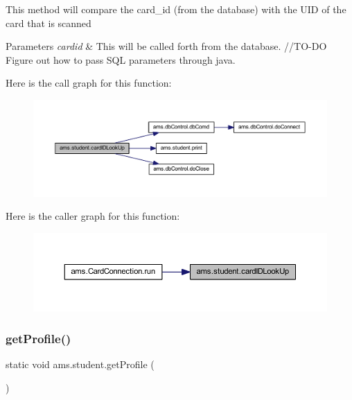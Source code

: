 This method will compare the card\+\_\+id (from the database) with the U\+ID of the card that is scanned 
\begin{DoxyParams}{Parameters}
{\em cardid} & This will be called forth from the database. //\+T\+O-\/\+DO Figure out how to pass S\+QL parameters through java. \\
\hline
\end{DoxyParams}
Here is the call graph for this function\+:\nopagebreak
\begin{figure}[H]
\begin{center}
\leavevmode
\includegraphics[width=350pt]{classams_1_1student_a8395e89b09114ce0b7d2c343b11c6d41_cgraph}
\end{center}
\end{figure}
Here is the caller graph for this function\+:\nopagebreak
\begin{figure}[H]
\begin{center}
\leavevmode
\includegraphics[width=350pt]{classams_1_1student_a8395e89b09114ce0b7d2c343b11c6d41_icgraph}
\end{center}
\end{figure}
\mbox{\label{classams_1_1student_a42b04eee66eade655dc460f622ebd7cd}} 
\subsubsection{\texorpdfstring{getProfile()}{getProfile()}}
{\footnotesize\ttfamily static void ams.\+student.\+get\+Profile (\begin{DoxyParamCaption}{ }\end{DoxyParamCaption})\hspace{0.3cm}{\ttfamily [static]}}

